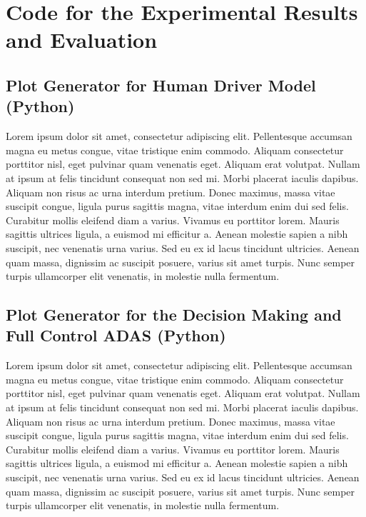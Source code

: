 \chapter{Code for the Experimental Results and Evaluation}

\section{Plot Generator for Human Driver Model (Python)}

Lorem ipsum dolor sit amet, consectetur adipiscing elit. Pellentesque accumsan magna eu metus congue, vitae tristique enim commodo. Aliquam consectetur porttitor nisl, eget pulvinar quam venenatis eget. Aliquam erat volutpat. Nullam at ipsum at felis tincidunt consequat non sed mi. Morbi placerat iaculis dapibus. Aliquam non risus ac urna interdum pretium. Donec maximus, massa vitae suscipit congue, ligula purus sagittis magna, vitae interdum enim dui sed felis. Curabitur mollis eleifend diam a varius. Vivamus eu porttitor lorem. Mauris sagittis ultrices ligula, a euismod mi efficitur a. Aenean molestie sapien a nibh suscipit, nec venenatis urna varius. Sed eu ex id lacus tincidunt ultricies. Aenean quam massa, dignissim ac suscipit posuere, varius sit amet turpis. Nunc semper turpis ullamcorper elit venenatis, in molestie nulla fermentum.

\section{Plot Generator for the Decision Making and Full Control ADAS (Python)}

Lorem ipsum dolor sit amet, consectetur adipiscing elit. Pellentesque accumsan magna eu metus congue, vitae tristique enim commodo. Aliquam consectetur porttitor nisl, eget pulvinar quam venenatis eget. Aliquam erat volutpat. Nullam at ipsum at felis tincidunt consequat non sed mi. Morbi placerat iaculis dapibus. Aliquam non risus ac urna interdum pretium. Donec maximus, massa vitae suscipit congue, ligula purus sagittis magna, vitae interdum enim dui sed felis. Curabitur mollis eleifend diam a varius. Vivamus eu porttitor lorem. Mauris sagittis ultrices ligula, a euismod mi efficitur a. Aenean molestie sapien a nibh suscipit, nec venenatis urna varius. Sed eu ex id lacus tincidunt ultricies. Aenean quam massa, dignissim ac suscipit posuere, varius sit amet turpis. Nunc semper turpis ullamcorper elit venenatis, in molestie nulla fermentum.
